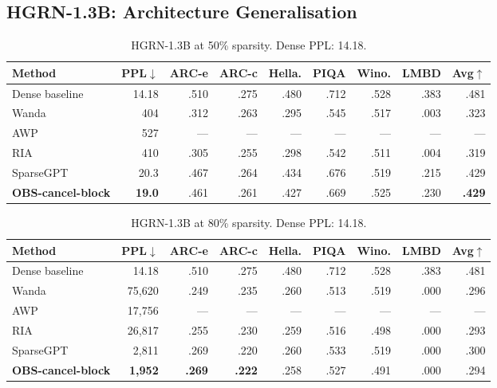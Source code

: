 \documentclass{article}
\begin{document}
\subsection{HGRN-1.3B: Architecture Generalisation}
\label{sec:hgrn}

\begin{table}[htbp]
  \centering
  \caption{HGRN-1.3B at 50\% sparsity. Dense PPL: 14.18.}
  \label{tab:hgrn_50}
  \small
  \begin{tabular}{lrrrrrrrr}
    \toprule
    Method & PPL$\downarrow$ & ARC-e & ARC-c & Hella. & PIQA & Wino. & LMBD & Avg$\uparrow$ \\
    \midrule
    Dense baseline            & 14.18 & .510 & .275 & .480 & .712 & .528 & .383 & .481 \\
    \midrule
    Wanda                     & 404   & .312 & .263 & .295 & .545 & .517 & .003 & .323 \\
    AWP                       & 527   & ---  & ---  & ---  & ---  & ---  & ---  & ---  \\
    RIA                       & 410   & .305 & .255 & .298 & .542 & .511 & .004 & .319 \\
    SparseGPT                 & 20.3  & .467 & .264 & .434 & .676 & .519 & .215 & .429 \\
    \textbf{OBS-cancel-block} & \textbf{19.0} & .461 & .261 & .427 & .669 & .525 & .230 & \textbf{.429} \\
    \bottomrule
  \end{tabular}
\end{table}

\begin{table}[htbp]
  \centering
  \caption{HGRN-1.3B at 80\% sparsity. Dense PPL: 14.18.}
  \label{tab:hgrn_80}
  \small
  \begin{tabular}{lrrrrrrrr}
    \toprule
    Method & PPL$\downarrow$ & ARC-e & ARC-c & Hella. & PIQA & Wino. & LMBD & Avg$\uparrow$ \\
    \midrule
    Dense baseline            & 14.18     & .510 & .275 & .480 & .712 & .528 & .383 & .481 \\
    \midrule
    Wanda                     & 75{,}620  & .249 & .235 & .260 & .513 & .519 & .000 & .296 \\
    AWP                       & 17{,}756  & ---  & ---  & ---  & ---  & ---  & ---  & ---  \\
    RIA                       & 26{,}817  & .255 & .230 & .259 & .516 & .498 & .000 & .293 \\
    SparseGPT                 &  2{,}811  & .269 & .220 & .260 & .533 & .519 & .000 & .300 \\
    \textbf{OBS-cancel-block} & \textbf{1{,}952} & \textbf{.269} & \textbf{.222} & .258 & .527 & .491 & .000 & .294 \\
    \bottomrule
  \end{tabular}
\end{table}
\end{document}
